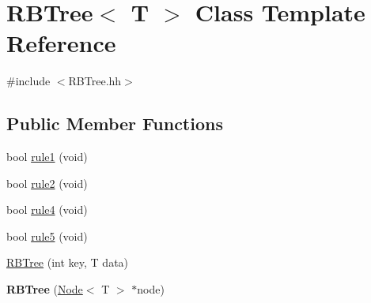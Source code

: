 \hypertarget{class_r_b_tree}{}\section{R\+B\+Tree$<$ T $>$ Class Template Reference}
\label{class_r_b_tree}


{\ttfamily \#include $<$R\+B\+Tree.\+hh$>$}

\subsection*{Public Member Functions}
\begin{DoxyCompactItemize}
\item 
bool \hyperlink{class_r_b_tree_ac5ef6ef34686c9e1036c35d3bf56f8cf}{rule1} (void)
\item 
bool \hyperlink{class_r_b_tree_a922765a4307e414802cb20bf9f405f7e}{rule2} (void)
\item 
bool \hyperlink{class_r_b_tree_acc448bf2bc24f8fdb83d293dca4f4810}{rule4} (void)
\item 
bool \hyperlink{class_r_b_tree_ad37bc2fd3c7b14c5d49862d4a3377b76}{rule5} (void)
\item 
\hyperlink{class_r_b_tree_a743575c444246d79b343bf7f8090eb9f}{R\+B\+Tree} (int key, T data)
\item 
\hypertarget{class_r_b_tree_afd8831000cdef5cd6215e17d0684f6f1}{}{\bfseries R\+B\+Tree} (\hyperlink{class_node}{Node}$<$ T $>$ $\ast$node)\label{class_r_b_tree_afd8831000cdef5cd6215e17d0684f6f1}


\end{DoxyCompactItemize}
